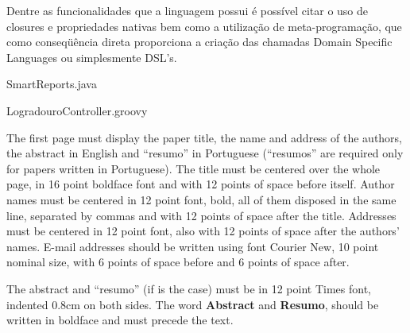 \documentclass[12pt]{article}
\begin{document}
    Dentre as funcionalidades que a linguagem possui é possível citar o uso de closures e propriedades nativas bem como a utilização de meta-programação, 
    que como conseqüência direta proporciona a criação das chamadas Domain Specific Languages ou simplesmente DSL's.



%


                 {SmartReports.java}
                 

                {LogradouroController.groovy}


The first page must display the paper title, the name and address of the
authors, the abstract in English and ``resumo'' in Portuguese (``resumos'' are
required only for papers written in Portuguese). The title must be centered
over the whole page, in 16 point boldface font and with 12 points of space
before itself. Author names must be centered in 12 point font, bold, all of
them disposed in the same line, separated by commas and with 12 points of
space after the title. Addresses must be centered in 12 point font, also with
12 points of space after the authors' names. E-mail addresses should be
written using font Courier New, 10 point nominal size, with 6 points of space
before and 6 points of space after.

The abstract and ``resumo'' (if is the case) must be in 12 point Times font,
indented 0.8cm on both sides. The word \textbf{Abstract} and \textbf{Resumo},
should be written in boldface and must precede the text.
\end{document}
